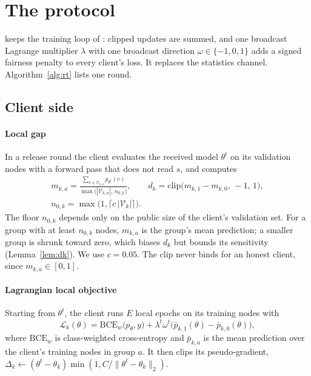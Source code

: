 \section{The \rt{} protocol}\label{sec:method}

\rt{} keeps the training loop of \clamp{}: clipped updates are summed, and one broadcast Lagrange multiplier $\lambda$ with one broadcast direction $\omega\in\{-1,0,1\}$ adds a signed fairness penalty to every client's loss. It replaces the statistics channel. Algorithm~\ref{alg:rt} lists one round.

\subsection{Client side}

\paragraph{Local gap}
In a release round the client evaluates the received model $\theta^t$ on its validation nodes with a forward pass that does not read $s$, and computes
\begin{equation}\label{eq:gap}
\begin{gathered}
m_{k,a}=\frac{\sum_{v\in\mathcal{V}_{k,a}}p_{\theta^t}(v)}{\max\bigl(|\mathcal{V}_{k,a}|,\,n_{0,k}\bigr)},\qquad d_k=\mathrm{clip}\bigl(m_{k,1}-m_{k,0},\,-1,\,1\bigr),\\
n_{0,k}=\max\bigl(1,\lceil c\,|\mathcal{V}_k|\rceil\bigr).
\end{gathered}
\end{equation}
The floor $n_{0,k}$ depends only on the public size of the client's validation set. For a group with at least $n_{0,k}$ nodes, $m_{k,a}$ is the group's mean prediction; a smaller group is shrunk toward zero, which biases $d_k$ but bounds its sensitivity (Lemma~\ref{lem:dk}). We use $c=0.05$. The clip never binds for an honest client, since $m_{k,a}\in[0,1]$.

\paragraph{Lagrangian local objective}
Starting from $\theta^t$, the client runs $E$ local epochs on its training nodes with
\begin{equation}\label{eq:local}
\mathcal{L}_k(\theta)=\mathrm{BCE}_w\bigl(p_\theta,y\bigr)+\lambda^t\omega^t\bigl(\bar p_{k,1}(\theta)-\bar p_{k,0}(\theta)\bigr),
\end{equation}
where $\mathrm{BCE}_w$ is class-weighted cross-entropy and $\bar p_{k,a}$ is the mean prediction over the client's training nodes in group $a$. It then clips its pseudo-gradient, $\Delta_k\leftarrow(\theta^t-\theta_k)\min(1,C/\|\theta^t-\theta_k\|_2)$.

